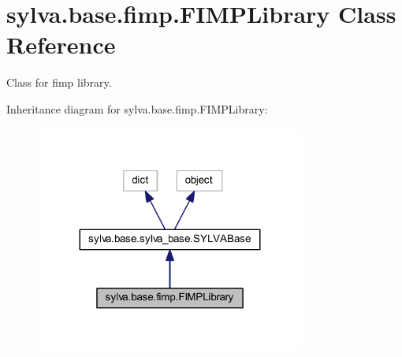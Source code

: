 \hypertarget{classsylva_1_1base_1_1fimp_1_1_f_i_m_p_library}{}\section{sylva.\+base.\+fimp.\+F\+I\+M\+P\+Library Class Reference}
\label{classsylva_1_1base_1_1fimp_1_1_f_i_m_p_library}


Class for fimp library.  




Inheritance diagram for sylva.\+base.\+fimp.\+F\+I\+M\+P\+Library\+:\nopagebreak
\begin{figure}[H]
\begin{center}
\leavevmode
\includegraphics[width=251pt]{classsylva_1_1base_1_1fimp_1_1_f_i_m_p_library__inherit__graph}
\end{center}
\end{figure}
